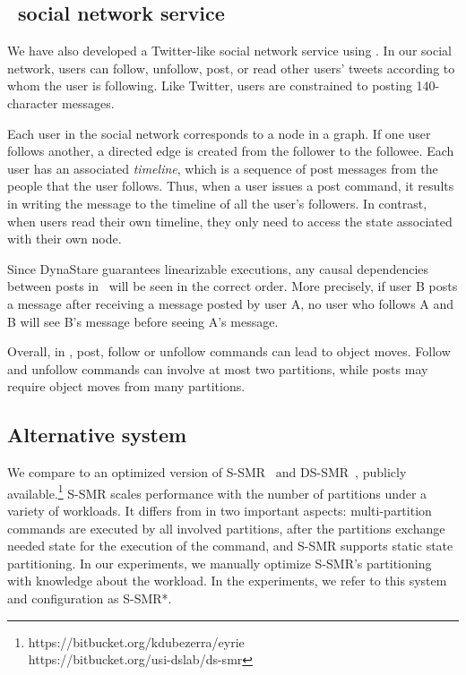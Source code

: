 
\subsection{\appname\ social network service}
\label{sec:imp:\appname}

We have also developed a Twitter-like
social network service using \dynastar{}.  In our social
network, users can follow, unfollow, post, or read other users' tweets
according to whom the user is following. Like Twitter, users are
constrained to posting 140-character messages.

Each user in the social network corresponds to a node in a graph. If
one user follows another, a directed edge is created from the
follower to the followee. Each user has an associated \emph{timeline},
which is a sequence of post messages from the people that the user
follows. Thus, when a user issues a post command, it results in
writing the message to the timeline of all the user's followers.  In
contrast, when users read their own timeline, they only need
to access the state associated with their own node.

Since DynaStare guarantees linearizable executions, any causal dependencies between posts in \appname\ will be seen in the correct order. 
More precisely, if user B posts a message after receiving a message posted by user A, no user who follows A and B will see B's message before seeing A's message.

Overall, in \appname, post, follow or unfollow commands can lead to
object moves.  Follow and unfollow commands can involve at most two
partitions, while posts may require object moves from many partitions.



\subsection{Alternative system}

We compare \dynastar{} to an optimized version of S-SMR~\cite{bezerra2014ssmr} and DS-SMR~\cite{hoang2016}, publicly available.\footnote{https://bitbucket.org/kdubezerra/eyrie\\ https://bitbucket.org/usi-dslab/ds-smr}
S-SMR scales performance with the number of partitions under a variety of workloads.
It differs from \dynastar{} in two important aspects:
multi-partition commands are executed by all involved partitions, after the partitions exchange needed state for the execution of the command, and S-SMR supports static state partitioning.
In our experiments, we manually optimize S-SMR's partitioning with knowledge about the workload.
In the experiments, we refer to this system and configuration as S-SMR*.

